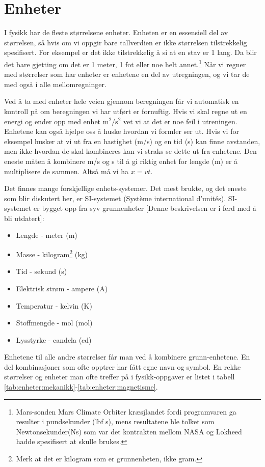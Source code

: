 \documentclass[a4paper,norsk,12pt]{book}
\begin{document}
\tableofcontents

\chapter{Enheter}
I fysikk har de fleste størrelsene enheter. Enheten er en essensiell del av størrelsen, så hvis om vi oppgir bare tallverdien er ikke størrelsen tilstrekkelig spesifisert. For eksempel er det ikke tilstrekkelig å si at en stav er 1 lang. Da blir det bare gjetting om det er 1 meter, 1 fot eller noe helt annet.\footnote{Mars-sonden Mars Climate Orbiter kræsjlandet fordi programvaren ga resulter i pundsekunder (lbf s), mens resultatene ble tolket som Newtonsekunder(Ns) som var det kontrakten mellom NASA og Lokheed hadde spesifisert at skulle brukes.} Når vi regner med størrelser som har enheter er enhetene en del av utregningen, og vi tar de med også i alle mellomregninger.

Ved å ta med enheter hele veien gjennom beregningen får vi automatisk en kontroll på om beregningen vi har utført er fornuftig. Hvis vi skal regne ut en energi og ender opp med enhet $\mathrm{m^2/s^2}$ vet vi at det er noe feil i utreningen. Enhetene kan også hjelpe oss å huske hvordan vi formler ser ut. Hvis vi for eksempel husker at vi ut fra en hastighet (m/s) og en tid (s) kan finne avstanden, men ikke hvordan de skal kombineres kan vi straks se dette ut fra enhetene. Den eneste måten å kombinere m/s og s til å gi riktig enhet for lengde (m) er å multiplisere de sammen. Altså må vi ha $x = vt$.

Det finnes mange forskjellige enhets-systemer. Det mest brukte, og det eneste som blir diskutert her, er SI-systemet (Système international d'unités). SI-systemet er bygget opp fra syv grunnenheter {\color{red}[Denne beskrivelsen er i ferd med å bli utdatert]}:
\begin{itemize}
\item Lengde - meter (m)
\item Masse - kilogram\footnote{Merk at det er kilogram som er grunnenheten, ikke gram.} (kg)
\item Tid - sekund (s)
\item Elektrisk strøm - ampere (A)
\item Temperatur - kelvin (K)
\item Stoffmengde - mol (mol)
\item Lysstyrke - candela (cd)
\end{itemize}
Enhetene til alle andre størrelser får man ved å kombinere grunn-enhetene. En del kombinasjoner som ofte opptrer har fått egne navn og symbol. En rekke størrelser og enheter man ofte treffer på i fysikk-oppgaver er listet i tabell \ref{tab:enheter:mekanikk}-\ref{tab:enheter:magnetisme}.
\end{document}
